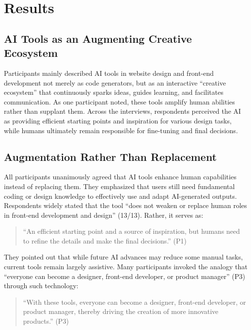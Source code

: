 \section{Results} \label{sec:results}

\subsection{AI Tools as an Augmenting Creative Ecosystem}

Participants mainly described AI tools in website design and front-end development not merely as code generators, but as an interactive ``creative ecosystem'' that continuously sparks ideas, guides learning, and facilitates communication. As one participant noted, these tools amplify human abilities rather than supplant them. Across the interviews, respondents perceived the AI as providing efficient starting points and inspiration for various design tasks, while humans ultimately remain responsible for fine-tuning and final decisions.

\subsection{Augmentation Rather Than Replacement}

All participants unanimously agreed that AI tools enhance human capabilities instead of replacing them. They emphasized that users still need fundamental coding or design knowledge to effectively use and adapt AI-generated outputs. Respondents widely stated that the tool ``does not weaken or replace human roles in front-end development and design'' (13/13). Rather, it serves as:

\begin{quote}
``An efficient starting point and a source of inspiration, but humans need to refine the details and make the final decisions.'' (P1)
\end{quote}

They pointed out that while future AI advances may reduce some manual tasks, current tools remain largely assistive. Many participants invoked the analogy that ``everyone can become a designer, front-end developer, or product manager'' (P3) through such technology:

\begin{quote}
``With these tools, everyone can become a designer, front-end developer, or product manager, thereby driving the creation of more innovative products.'' (P3)
\end{quote}

